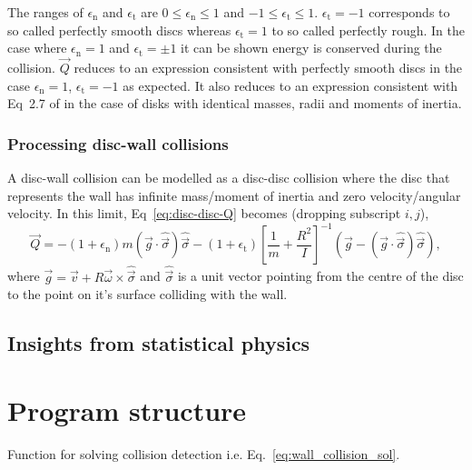 \documentclass{article}
\begin{document}
The ranges of $\epsilon_\mathrm{n}$ and $\epsilon_\mathrm{t}$ are $0 \leq \epsilon_\mathrm{n} \leq 1$ and $-1 \leq \epsilon_\mathrm{t} \leq 1$. $\epsilon_\mathrm{t} = -1$ corresponds to so called perfectly smooth discs whereas $\epsilon_\mathrm{t} = 1$ to so called perfectly rough. In the case where $\epsilon_\mathrm{n} = 1$ and $\epsilon_\mathrm{t} = \pm 1$ it can be shown energy is conserved during the collision. $\vec{Q}$ reduces to an expression consistent with perfectly smooth discs in the case $\epsilon_\mathrm{n} = 1$, $\epsilon_\mathrm{t} = -1$ as expected. It also reduces to an expression consistent with Eq~2.7 of \cite{Kremer-2014} in the case of disks with identical masses, radii and moments of inertia.

\subsubsection{Processing disc-wall collisions}
A disc-wall collision can be modelled as a disc-disc collision where the disc that represents the wall has infinite mass/moment of inertia and zero velocity/angular velocity. In this limit, Eq~\ref{eq:disc-disc-Q} becomes (dropping subscript $i, j$),
\begin{equation}
    \vec{Q}
    =
    -(1 + \epsilon_\mathrm{n})
    m
    (\vec{g} \cdot \hat{\vec{\sigma}}) \hat{\vec{\sigma}}
    -
    (1+\epsilon_\mathrm{t})
    \left[
        \frac{1}{m}
        +
        \frac{R^2}{I}
    \right]^{-1}
    \left(
        \vec{g} - (\vec{g} \cdot \hat{\vec{\sigma}}) \hat{\vec{\sigma}}
    \right),
\end{equation}
where $\vec{g} = \vec{v} + R \vec{\omega} \times \hat{\vec{\sigma}}$ and $\hat{\vec{\sigma}}$ is a unit vector pointing from the centre of the disc to the point on it's surface colliding with the wall.

\subsection{Insights from statistical physics}

\section{Program structure}
Function for solving collision detection i.e. Eq.~\ref{eq:wall_collision_sol}.
\end{document}

